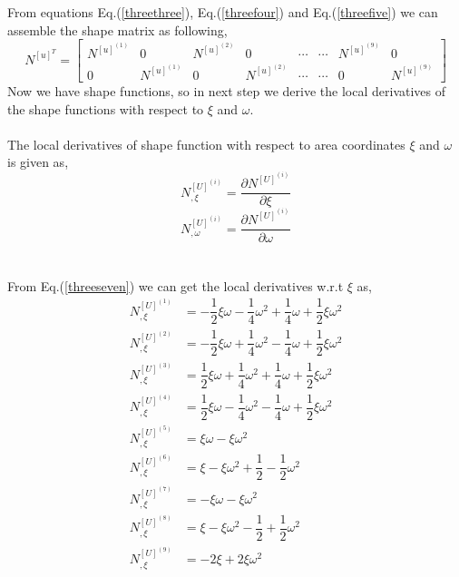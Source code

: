 \documentclass[12pt]{article}
\begin{document}
\\
\\
From equations Eq.(\ref{threethree}), Eq.(\ref{threefour}) and Eq.(\ref{threefive}) we can assemble the shape matrix as following,
\begin{equation}\label{threesix}
N^{[u]^{T}}=
\begin{bmatrix}
N^{[u]^{(1)}}&0&N^{[u]^{(2)}}&0&\cdots &\cdots& N^{[u]^{(9)}}&0 \\
0&N^{[u]^{(1)}}&0&N^{[u]^{(2)}}&\cdots &\cdots& 0&N^{[u]^{(9)}}
\end{bmatrix}
\end{equation}
\newpage
Now we have shape functions, so in next step we derive the local derivatives of the shape functions with respect to $\xi$ and $\omega$. 
\\
\\
The local derivatives of shape function with respect to area coordinates $\xi$ and $\omega$ is given as, 
\begin{equation}\label{threeseven}
N^{[U]^{(i)}}_{,\xi} = \dfrac{\partial N^{[U]^{(i)}} }{\partial \xi}
\end{equation}
\begin{equation}\label{threeeight}
N^{[U]^{(i)}}_{,\omega} = \dfrac{\partial N^{[U]^{(i)}} }{\partial \omega}
\end{equation}
\\
\\
From Eq.(\ref{threeseven}) we can get the local derivatives w.r.t  $\xi$ as,
\begin{equation}\label{threenine}
\begin{aligned}
N_{,\xi}^{[U]^{(1)}} &= -\dfrac{1}{2}\xi\omega-\dfrac{1}{4}\omega^2+\dfrac{1}{4}\omega+\dfrac{1}{2}\xi\omega^2  \\
N_{,\xi}^{[U]^{(2)}} &= -\dfrac{1}{2}\xi\omega+\dfrac{1}{4}\omega^2-\dfrac{1}{4}\omega+\dfrac{1}{2}\xi\omega^2  \\
N_{,\xi}^{[U]^{(3)}} &= \dfrac{1}{2}\xi\omega+\dfrac{1}{4}\omega^2+\dfrac{1}{4}\omega+\dfrac{1}{2}\xi\omega^2 \\
N_{,\xi}^{[U]^{(4)}} &= \dfrac{1}{2}\xi\omega-\dfrac{1}{4}\omega^2-\dfrac{1}{4}\omega+\dfrac{1}{2}\xi\omega^2 \\
N_{,\xi}^{[U]^{(5)}} &= \xi\omega-\xi\omega^2 \\
N_{,\xi}^{[U]^{(6)}} &= \xi-\xi\omega^2+\dfrac{1}{2}-\dfrac{1}{2}\omega^2 \\
N_{,\xi}^{[U]^{(7)}} &= -\xi\omega-\xi\omega^2 \\
N_{,\xi}^{[U]^{(8)}} &= \xi-\xi\omega^2-\dfrac{1}{2}+\dfrac{1}{2}\omega^2 \\
N_{,\xi}^{[U]^{(9)}} &= -2\xi+2\xi\omega^2 \\
\end{aligned}
\end{equation}
\end{document}
